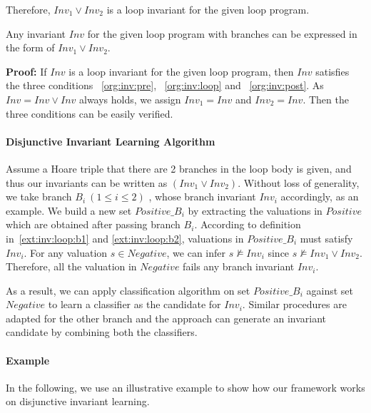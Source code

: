 Therefore, $Inv_1 \vee Inv_2$ is a loop invariant for the given loop program. %

\begin{theorem}
\label{thm:invariant:is:disjunctive}
	Any invariant $Inv$ for the given loop program with branches can be expressed in the form of $Inv_1 \vee Inv_2$.
\end{theorem}

\noindent \textbf{Proof:} If $Inv$ is a loop invariant for the given loop program,
then $Inv$ satisfies the three conditions ~\ref{org:inv:pre}, ~\ref{org:inv:loop} and ~\ref{org:inv:post}.
As $Inv = Inv \vee Inv$ always holds, we assign $Inv_1 = Inv$ and $Inv_2 = Inv$.
Then the three conditions can be easily verified. %

\paragraph{Disjunctive Invariant Learning Algorithm}
Assume a Hoare triple that there are 2 branches in the loop body is given, 
and thus our invariants can be written as $(Inv_1 \vee Inv_2)$.
Without loss of generality, we take branch $B_i~(1 \le i \le 2)$ , whose branch invariant $Inv_i$ accordingly, as an example.
We build a new set $\mathit{Positive\_B_i}$ by extracting the valuations in $\mathit{Positive}$ which are obtained after passing branch $B_i$.
According to definition in~\ref{ext:inv:loop:b1} and \ref{ext:inv:loop:b2}, 
valuations in $\mathit{Positive\_B_i}$ must satisfy $Inv_i$.
For any valuation $s \in \mathit{Negative}$, 
we can infer $s \not \models Inv_i$ since $s \not \models Inv_1 \vee Inv_2$.
Therefore, all the valuation in $\mathit{Negative}$ fails any branch invariant $Inv_i $.

As a result, we can apply classification algorithm on set $\mathit{Positive\_B_i}$ against set $\mathit{Negative}$ to learn a classifier as the candidate for $Inv_i$.
Similar procedures are adapted for the other branch and the approach can generate an invariant candidate by combining both the classifiers.

\paragraph{Example}
In the following, we use an illustrative example to show how our framework works on disjunctive invariant learning. 


